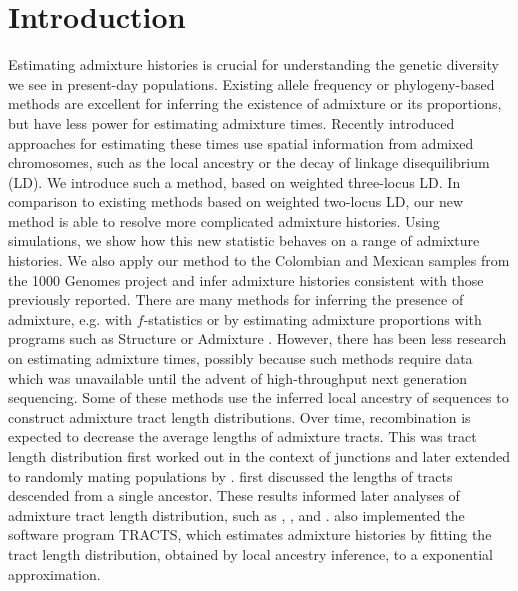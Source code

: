 \section*{Introduction}
Estimating admixture histories is crucial for understanding the genetic diversity we see in present-day populations. Existing allele frequency or phylogeny-based methods are excellent for inferring the existence of admixture or its proportions, but have less power for estimating admixture times. Recently introduced approaches for estimating these times use spatial information from admixed chromosomes, such as the local ancestry or the decay of linkage disequilibrium (LD). We introduce such a method, based on weighted three-locus LD. In comparison to existing methods based on weighted two-locus LD, our new method is able to resolve more complicated admixture histories. Using simulations, we show how this new statistic behaves on a range of admixture histories. We also apply our method to the Colombian and Mexican samples from the 1000 Genomes project and infer admixture histories consistent with those previously reported.
There are many methods for inferring the presence of admixture, e.g. with $f$-statistics \cite{reich2009reconstructing} or by estimating admixture proportions with programs such as Structure \cite{pritchard2000inference} or Admixture \cite{alexander2009fast}. However, there has been less research on estimating admixture times, possibly because such methods require data which was unavailable until the advent of high-throughput next generation sequencing. Some of these methods use the inferred local ancestry of sequences to construct admixture tract length distributions. Over time, recombination is expected to decrease the average lengths of admixture tracts. This was tract length distribution first worked out in the context of junctions \cite{fisher1949theory} and later extended to randomly mating populations by \cite{stam1980distribution}. \cite{baird2003distribution} first discussed the lengths of tracts descended from a single ancestor. These results informed later analyses of admixture tract length distribution, such as \cite{pool2009inference}, \cite{gravel2012population}, and \cite{liang2014lengths}. \cite{gravel2012population} also implemented the software program TRACTS, which estimates admixture histories by fitting the tract length distribution, obtained by local ancestry inference, to a exponential approximation.

